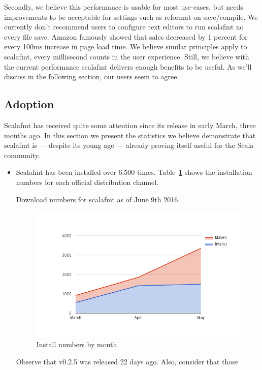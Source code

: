 Secondly, we believe this performance is usable for most use-cases, but needs improvements to be acceptable for settings such as reformat on save/compile.
We currently don't recommend users to configure text editors to run scalafmt no every file save.
Amazon famously showed that sales decreased by 1 percent for every 100ms increase in page load time\autocite{kohavi2007online}.
We believe similar principles apply to scalafmt, every millisecond counts in the user experience.
Still, we believe with the current performance scalafmt delivers enough benefits to be useful.
As we'll discuss in the following section, our users seem to agree.

\subsection{Adoption}\label{sec:adoption}
Scalafmt has received quite some attention since its release in early March, three months ago.
In this section we present the statistics we believe demonstrate that scalafmt is --- despite its young age --- already proving itself useful for the Scala community.

\begin{itemize}
  \item Scalafmt has been installed over 6.500 times.
    Table~\ref{tab:installs} shows the installation numbers for each official distribution channel.
    \begin{table}
      \centering
      
      \caption{Download numbers for scalafmt as of June 9th 2016.}\label{tab:installs}
    \end{table}
    \begin{figure}
      \centering
      \includegraphics[width=\linewidth]{img/installs_by_month.png}
      \caption{Install numbers by month}\label{tab:installs}
    \end{figure}
    Observe that v0.2.5 was released 22 days ago.
    Also, consider that those
\end{itemize}



